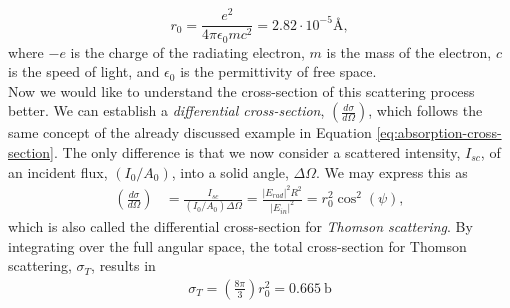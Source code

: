 \begin{equation}
r_0 = \frac{e^2}{4\pi \epsilon_0 m c^2} = 2.82\cdot 10^{-5}\si{\angstrom},
\label{eq:thomson-scattering-length}
\end{equation}
where $-e$ is the charge of the radiating electron, $m$ is the mass of the electron, $c$ is the speed of light, and $\epsilon_0$ is the permittivity of free space.\\[1\baselineskip]
%
Now we would like to understand the cross-section of this scattering process better. We can establish a \textit{differential cross-section}, $\left(\tfrac{d\sigma}{d\Omega}\right)$, which follows the same concept of the already discussed example in Equation \eqref{eq:absorption-cross-section}. The only difference is that we now consider a scattered intensity, $I_{sc}$, of an incident flux, $\left(I_{0}/A_{0}\right)$, into a solid angle, $\Delta \Omega$. We may express this as
\begin{align}
\left(\frac{d\sigma}{d\Omega}\right)&=\frac{I_{sc}}{\left(I_{0}/A_{0}\right)\Delta\Omega}=\frac{\lvert E_{rad}\rvert^2 R^2}{\lvert E_{in}\rvert^2}=r_0^2 \cos^{2}\left(\psi\right),
\label{eq:scattering-crosssection}
\end{align}
which is also called the differential cross-section for \textit{Thomson scattering}. By integrating over the full angular space, the total cross-section for Thomson scattering, $\sigma_{T}$, results in
\begin{align}
\sigma_{T} = \left(\frac{8\pi}{3}\right) r_{0}^{2} = \SI{0.665}{\barn}
\label{eq:Thomson-cross-section}
\end{align}
